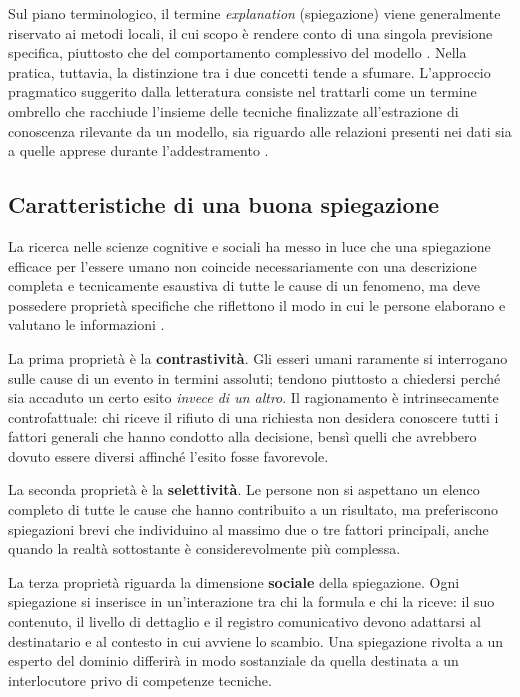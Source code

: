 Sul piano terminologico, il termine \textit{explanation} (spiegazione) viene generalmente riservato ai metodi locali, il cui scopo è rendere conto di una singola previsione specifica, piuttosto che del comportamento complessivo del modello \cite{molnar2025interpretable}. Nella pratica, tuttavia, la distinzione tra i due concetti tende a sfumare. L'approccio pragmatico suggerito dalla letteratura consiste nel trattarli come un termine ombrello che racchiude l'insieme delle tecniche finalizzate all'estrazione di conoscenza rilevante da un modello, sia riguardo alle relazioni presenti nei dati sia a quelle apprese durante l'addestramento \cite{molnar2025interpretable}.

\subsection{Caratteristiche di una buona spiegazione}

La ricerca nelle scienze cognitive e sociali ha messo in luce che una spiegazione efficace per l'essere umano non coincide necessariamente con una descrizione completa e tecnicamente esaustiva di tutte le cause di un fenomeno, ma deve possedere proprietà specifiche che riflettono il modo in cui le persone elaborano e valutano le informazioni \cite{molnar2025interpretable}.

La prima proprietà è la \textbf{contrastività}. Gli esseri umani raramente si interrogano sulle cause di un evento in termini assoluti; tendono piuttosto a chiedersi perché sia accaduto un certo esito \textit{invece di un altro}. Il ragionamento è intrinsecamente controfattuale: chi riceve il rifiuto di una richiesta non desidera conoscere tutti i fattori generali che hanno condotto alla decisione, bensì quelli che avrebbero dovuto essere diversi affinché l'esito fosse favorevole.

La seconda proprietà è la \textbf{selettività}. Le persone non si aspettano un elenco completo di tutte le cause che hanno contribuito a un risultato, ma preferiscono spiegazioni brevi che individuino al massimo due o tre fattori principali, anche quando la realtà sottostante è considerevolmente più complessa.

La terza proprietà riguarda la dimensione \textbf{sociale} della spiegazione. Ogni spiegazione si inserisce in un'interazione tra chi la formula e chi la riceve: il suo contenuto, il livello di dettaglio e il registro comunicativo devono adattarsi al destinatario e al contesto in cui avviene lo scambio. Una spiegazione rivolta a un esperto del dominio differirà in modo sostanziale da quella destinata a un interlocutore privo di competenze tecniche.

